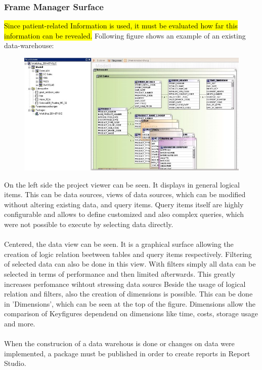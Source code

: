 \documentclass[a4paper]{article}
\begin{document}
	\subsubsection{Frame Manager Surface}
	\hl{Since patient-related Information is used, it must be evaluated how far this information can be revealed.}
	Following figure shows an example of an existing data-warehouse:\\
	\begin{figure}[!ht]
		  \centering
		      \includegraphics[width=1.0\textwidth]{frameworkM_2}
		  \caption{}
	\end{figure}
	On the left side the project viewer can be seen. It displays in general logical items. This can be data sources,
	views of data sources, which can be modified without altering existing data, and query items. Query items itself
	are highly configurable and allows to define customized and also complex
	queries, which were not possible to execute by selecting data directly.\\
	\\
	Centered, the data view can be seen. It is a graphical surface allowing the
	creation of logic relation beetween tables and query items respectively.
	Filtering of selected data can also be done in this view. With filters
	simply all data can be selected in terms of performance and then limited
	afterwards. This greatly increases perfomance wihtout stressing data sourcs
	Beside the usage of logical relation and filters, also the creation of
	dimensions is possible.
	This can be done in 'Dimensions', which can be seen at the top of the figure. 
	Dimensions allow the comparison of
	Keyfigures dependend on dimensions like time, costs, storage usage and more.\\
	\\
	When the construcion of a data warehous is done or changes on data were
	implemented, a package must be published in order to create reports in Report
	Studio.
\end{document}
